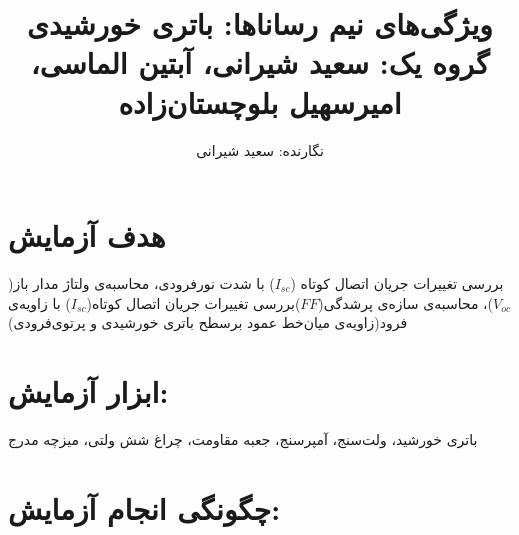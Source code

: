 \documentclass{article}
\begin{document}
	
	\title {ویژگی‌های نیم رساناها: باتری‌ خورشیدی\\
		\vspace{0.5cm}
		\large گروه یک: سعید شیرانی، آبتین الماسی، امیرسهیل بلوچستان‌زاده\\}
	
	\author{نگارنده: سعید شیرانی} 
	
	\affil{ }
	\maketitle
	\newpage{}
	\normalsize 
	
	\section{هدف آزمایش}
	\vspace{5mm}
	\normalsize
	
	بررسی تغییرات جریان اتصال کوتاه ($I_{sc}$) با شدت نور‌فرودی، محاسبه‌ی ولتاژ مدار باز($V_{oc}$)، محاسبه‌ی سازه‌ی پرشدگی($FF$)بررسی تغییرات جریان اتصال کوتاه($I_{sc}$) با زاویه‌‌ی فرود(زاویه‌ی میان‌خط عمود برسطح باتری خورشیدی و پرتوی‌فرودی)
	
	\section{ابزار آزمایش:}
	باتری خورشید، ولت‌سنج، آمپرسنج، جعبه مقاومت، چراغ شش ولتی، میزچه مدرج
	\section{چگونگی انجام آزمایش:}
	
\end{document}

